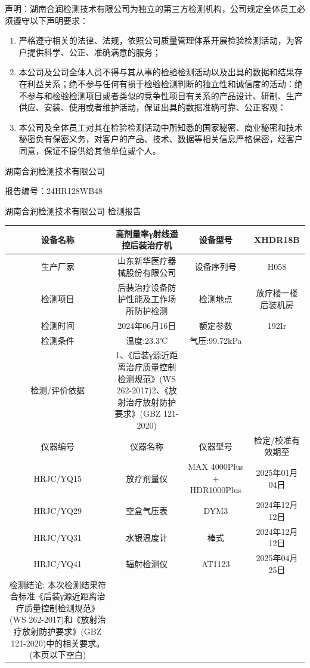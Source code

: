 声明：湖南合润检测技术有限公司为独立的第三方检测机构，公司规定全体员工必须遵守以下声明要求：

\begin{enumerate}
\item 严格遵守相关的法律、法规，依照公司质量管理体系开展检验检测活动，为客户提供科学、公正、准确满意的服务；
\item 本公司及公司全体人员不得与其从事的检验检测活动以及出具的数据和结果存在利益关系；绝不参与任何有损于检验检测判断的独立性和诚信度的活动：绝不参与和检验检测项目或者类似的竞争性项目有关系的产品设计、研制、生产供应、安装、使用或者维护活动，保证出具的数据准确可靠、公正客观：
\item 本公司及全体员工对其在检验检测活动中所知悉的国家秘密、商业秘密和技术秘密负有保密义务，对客户的产品、技术、数据等相关信息严格保密，经客户同意，保证不提供给其他单位或个人。
\end{enumerate}

湖南合润检测技术有限公司

报告编号：24HR128WB48

湖南合润检测技术有限公司
检测报告

\begin{table}[H]
\centering
\begin{tabular}{|c|c|c|c|}
\hline
设备名称 & 高剂量率γ射线遥控后装治疗机 & 设备型号 & XHDR18B \\
\hline
生产厂家 & 山东新华医疗器械股份有限公司 & 设备序列号 & H058 \\
\hline
检测项目 & 后装治疗设备防护性能及工作场所防护检测 & 检测地点 & 放疗楼一楼后装机房 \\
\hline
检测时间 & 2024年06月16日 & 额定参数 & 192Ir \\
\hline
检测条件 & 温度:23.3℃ & 气压:99.72kPa &  \\
\hline
检测/评价依据 & 1、《后装γ源近距离治疗质量控制检测规范》(WS 262-2017)2、《放射治疗放射防护要求》(GBZ 121-2020) &  &  \\
\hline
仪器编号 & 仪器名称 & 仪器型号 & 检定/校准有效期至 \\
\hline
HRJC/YQ15 & 放疗剂量仪 & MAX 4000Plus + HDR1000Plus & 2025年01月04日 \\
\hline
HRJC/YQ29 & 空盒气压表 & DYM3 & 2024年12月12日 \\
\hline
HRJC/YQ31 & 水银温度计 & 棒式 & 2024年12月12日 \\
\hline
HRJC/YQ41 & 辐射检测仪 & AT1123 & 2025年04月25日 \\
\hline
检测结论: 本次检测结果符合标准《后装γ源近距离治疗质量控制检测规范》(WS 262-2017)和《放射治疗放射防护要求》(GBZ 121-2020)中的相关要求。 (本页以下空白) &  &  &  \\
\hline
\end{tabular}
\end{table}


